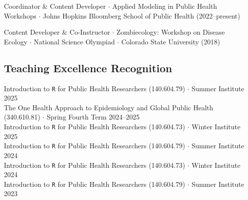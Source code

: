 \documentclass{cv}
\begin{document}
Coordinator \& Content Developer $\cdot$ Applied Modeling in Public Health Workshops $\cdot$ Johns Hopkins Bloomberg School of Public Health (2022--present)

Content Developer \& Co-Instructor $\cdot$ Zombiecology: Workshop on Disease Ecology $\cdot$ National Science Olympiad $\cdot$ Colorado State University (2018)






\subsection*{Teaching Excellence Recognition}

Introduction to \texttt{R} for Public Health Researchers (140.604.79) $\cdot$ Summer Institute 2025 \\
The One Health Approach to Epidemiology and Global Public Health (340.610.81) $\cdot$ Spring Fourth Term 2024--2025 \\
Introduction to \texttt{R} for Public Health Researchers (140.604.73) $\cdot$ Winter Institute 2025 \\
Introduction to \texttt{R} for Public Health Researchers (140.604.79) $\cdot$ Summer Institute 2024 \\
Introduction to \texttt{R} for Public Health Researchers (140.604.73) $\cdot$ Winter Institute 2024 \\
Introduction to \texttt{R} for Public Health Researchers (140.604.79) $\cdot$ Summer Institute 2023

\end{document}
